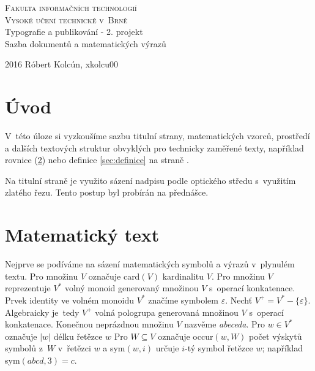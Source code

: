 \documentclass[11pt,a4paper,twocolumn]{article}
\begin{document}
	\theoremstyle{definition}
	\newtheorem{definice}{Definice}[section]
	\newtheorem{algoritmus}[definice]{Algoritmus}
	\newtheorem{veta}{Veta}
	
	\begin{titlepage}
		
		\begin{center}
			\Huge
			\textsc{Fakulta informačních technologií \\[-0.35cm] Vysoké učení technické v~Brně \\}
			\LARGE
			Typografie a publikování - 2. projekt \\[-0.2cm] Sazba dokumentů a matematických výrazů
		\end{center}
		{\Large 2016 \hfill
			Róbert Kolcún, xkolcu00}
	\end{titlepage}
	
	
	
	\setcounter{secnumdepth}{0}
	\section{Úvod}
	
	V~této úloze si vyzkoušíme sazbu titulní strany, matematických vzorců, prostředí a dalších textových struktur obvyklých pro technicky zaměřené texty, například rovnice %
	(\ref{sec:MT}) nebo definice \ref{sec:definice} na straně \pageref{sec:MT}.
	
	Na titulní straně je využito sázení nadpisu podle optického středu s~využitím zlatého řezu. Tento postup byl probírán na přednášce.
		
	\setcounter{secnumdepth}{2}
	\section{Matematický text}
	\label{sec:MT}
	
	Nejprve se podíváme na sázení matematických symbolů a výrazů v~plynulém textu. Pro množinu $V$ označuje card$(V)$ kardinalitu $V$.
	Pro množinu $V$ reprezentuje $V^*$ volný monoid generovaný množinou $V$ s~operací konkatenace.
	Prvek identity ve volném monoidu $V^*$ značíme symbolem $\varepsilon$.
	Nechť $V^+ = V^* - \{\varepsilon\}$. Algebraicky je~tedy $V^+$ volná pologrupa generovaná množinou $V$ s~operací konkatenace.
	Konečnou neprázdnou množinu $V$ nazvěme \textit{abeceda}.
	Pro $w \in V^*$ označuje $|w|$ délku řetězce $w$ Pro $W \subseteq V$ označuje occur$(w, W)$ počet výskytů symbolů \linebreak z~$W$ v~řetězci $w$ a sym$(w,i)$ určuje $i$-tý symbol řetězce \linebreak $w$; například sym$(abcd,3) = c$.
		
\end{document}
